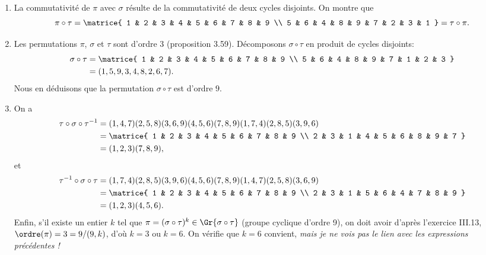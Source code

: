 \begin{enumerate}
  \item  %
    La commutativité de $\pi$ avec $\sigma$ résulte de la commutativité de deux cycles disjoints.
    On montre que
    \[
      \pi\circ\tau = \matrice{
        1 & 2 & 3 & 4 & 5 & 6 & 7 & 8 & 9 \\
        5 & 6 & 4 & 8 & 9 & 7 & 2 & 3 & 1
      } = \tau\circ\pi.
    \]

  \item %
    Les permutations $\pi$, $\sigma$ et $\tau$ sont d'ordre $3$ (proposition 3.59).
    Décomposons $\sigma\circ\tau$ en produit de cycles disjoints:
    \begin{align*}
      \sigma\circ\tau 
        &= \matrice{
            1 & 2 & 3 & 4 & 5 & 6 & 7 & 8 & 9 \\
            5 & 6 & 4 & 8 & 9 & 7 & 1 & 2 & 3
        } \\
        &= (1,5,9,3,4,8,2,6,7).
    \end{align*}
    Nous en déduisons que la permutation $\sigma\circ\tau$ est d'ordre $9$.

  \item %
    On a
    \begin{align*}
      \tau\circ\sigma\circ\tau^{-1}
        &= (1,4,7)(2,5,8)(3,6,9)(4,5,6)(7,8,9)(1,7,4)(2,8,5)(3,9,6) \\
        &= \matrice{
            1 & 2 & 3 & 4 & 5 & 6 & 7 & 8 & 9 \\
            2 & 3 & 1 & 4 & 5 & 6 & 8 & 9 & 7 
        } \\
        &= (1,2,3)(7,8,9),
    \end{align*}
    et
    \begin{align*}
      \tau^{-1}\circ\sigma\circ\tau
        &= (1,7,4)(2,8,5)(3,9,6)(4,5,6)(7,8,9)(1,4,7)(2,5,8)(3,6,9) \\
        &= \matrice{
            1 & 2 & 3 & 4 & 5 & 6 & 7 & 8 & 9 \\
            2 & 3 & 1 & 5 & 6 & 4 & 7 & 8 & 9
        } \\
        &= (1,2,3)(4,5,6).
    \end{align*}
    Enfin, s'il existe un entier $k$ tel que $\pi = (\sigma\circ \tau)^k \in \Gr{\sigma\circ \tau}$ (groupe cyclique d'ordre 9), on doit avoir d'après l'exercice III.13, $\ordre(\pi) = 3 = 9/(9,k)$, d'où $k = 3$ ou $k = 6$.
    On vérifie que $k = 6$ convient, \emph{mais je ne vois pas le lien avec les expressions précédentes !}
\end{enumerate}
